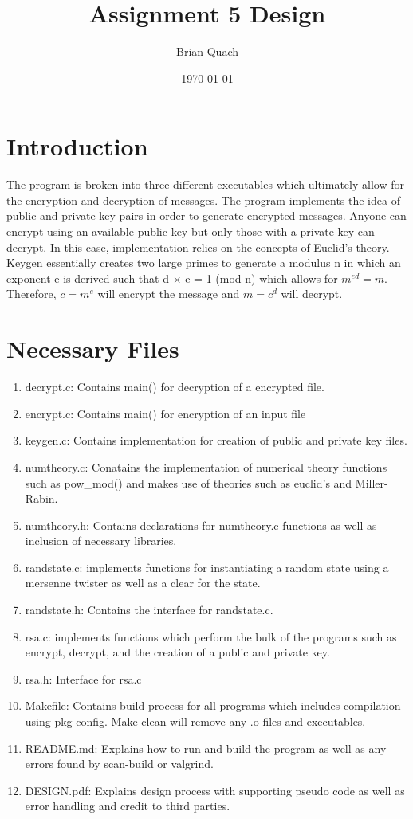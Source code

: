 \documentclass[11pt]{article}
\title{Assignment 5 Design}
\author{Brian Quach}
\date{\today}
\begin{document}
 \maketitle

\section{Introduction}
The program is broken into three different executables which ultimately allow for the encryption and decryption of messages. The program implements the idea of public and private key pairs in order to generate encrypted messages. Anyone can encrypt using an available public key but only those with a private key can decrypt. In this case, implementation relies on the concepts of Euclid's theory. Keygen essentially creates two large primes to generate a modulus n in which an exponent e is derived such that d \(\times\) e = 1 (mod n) which allows for \(m^{ed} = m\). Therefore, \(c = m^e\) will encrypt the message and \(m = c^d\) will decrypt.

\section{Necessary Files}
\begin{enumerate}
    \item decrypt.c: Contains main() for decryption of a encrypted file.
    \item encrypt.c: Contains main() for encryption of an input file
    \item keygen.c: Contains implementation for creation of public and private key files.
    \item numtheory.c: Conatains the implementation of numerical theory functions such as pow\_mod() and makes use of theories such as euclid's and Miller-Rabin.
    \item numtheory.h: Contains declarations for numtheory.c functions as well as inclusion of necessary libraries.
    \item randstate.c: implements functions for instantiating a random state using a mersenne twister as well as a clear for the state.
    \item randstate.h: Contains the interface for randstate.c.
    \item rsa.c: implements functions which perform the bulk of the programs such as encrypt, decrypt, and the creation of a public and private key.
    \item rsa.h: Interface for rsa.c
    \item Makefile: Contains build process for all programs which includes compilation using pkg-config. Make clean will remove any .o files and executables.
    \item README.md: Explains how to run and build the program as well as any errors found by scan-build or valgrind.
    \item DESIGN.pdf: Explains design process with supporting pseudo code as well as error handling and credit to third parties.
\end{enumerate}
\end{document}
